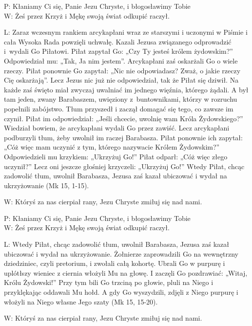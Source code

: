 ﻿\documentclass[9pt,twoside]{extarticle}
\begin{document}
{\hnr P:} Kłaniamy Ci się, Panie Jezu Chryste, i błogosławimy Tobie\\
{\hnr W:} Żeś przez Krzyż i Mękę swoją świat odkupić raczył.


{\hnr L:} Zaraz wczesnym rankiem arcykapłani wraz ze starszymi i uczonymi w Piśmie i cała Wysoka Rada powzięli uchwałę. Kazali Jezusa związanego odprowadzić i~wydali Go Piłatowi. Piłat zapytał Go: „Czy Ty jesteś królem żydowskim?” Odpowiedział mu: „Tak, Ja nim jestem”. Arcykapłani zaś oskarżali Go o wiele rzeczy. Piłat ponownie Go zapytał: „Nic nie odpowiadasz? Zważ, o jakie rzeczy Cię oskarżają”. Lecz Jezus nic już nie odpowiedział, tak że Piłat się dziwił. Na każde zaś święto miał zwyczaj uwalniać im jednego więźnia, którego żądali. A był tam jeden, zwany Barabaszem, uwięziony z~buntownikami, którzy w rozruchu popełnili zabójstwo. Tłum przyszedł i zaczął domagać się tego, co zawsze im czynił.  Piłat im odpowiedział: „Jeśli chcecie, uwolnię wam Króla Żydowskiego?”  Wiedział bowiem, że arcykapłani wydali Go przez zawiść. Lecz arcykapłani podburzyli tłum, żeby uwolnił im raczej Barabasza.  Piłat ponownie ich zapytał: „Cóż więc mam uczynić z tym, którego nazywacie Królem Żydowskim?” Odpowiedzieli mu krzykiem: „Ukrzyżuj Go!” Piłat odparł: „Cóż więc złego uczynił?” Lecz oni jeszcze głośniej krzyczeli: „Ukrzyżuj Go!” Wtedy Piłat, chcąc zadowolić tłum, uwolnił Barabasza, Jezusa zaś kazał ubiczować i wydał na ukrzyżowanie (Mk 15, 1-15).


{\hnr W:} Któryś za nas cierpiał rany, Jezu Chryste zmiłuj się nad nami.


{\hnr{}}


{\hnr P:} Kłaniamy Ci się, Panie Jezu Chryste, i błogosławimy Tobie\\
{\hnr W:} Żeś przez Krzyż i Mękę swoją świat odkupić raczył.


{\hnr L:} Wtedy Piłat, chcąc zadowolić tłum, uwolnił Barabasza, Jezusa zaś kazał ubiczować i wydał na ukrzyżowanie. Żołnierze zaprowadzili Go na wewnętrzny dziedziniec, czyli pretorium, i zwołali całą kohortę. Ubrali Go w purpurę i uplótłszy wieniec z ciernia włożyli Mu na głowę. I zaczęli Go pozdrawiać: „Witaj, Królu Żydowski!”  Przy tym bili Go trzciną po głowie, pluli na Niego i przyklękając oddawali Mu hołd. A gdy Go wyszydzili, zdjęli z Niego purpurę i włożyli na Niego własne Jego szaty (Mk 15, 15-20). 


{\hnr W:} Któryś za nas cierpiał rany, Jezu Chryste zmiłuj się nad nami.
\end{document}
